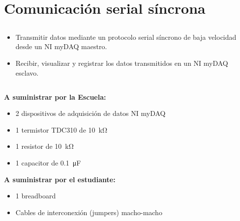 \chapter{Comunicación serial síncrona}
\section{\obj}
\capacidad
\begin{itemize}
\item Transmitir datos mediante un protocolo serial síncrono de baja velocidad desde un NI myDAQ maestro.
\item Recibir, visualizar y registrar los datos transmitidos en un NI myDAQ esclavo.
\end{itemize}

\section{\mat}
\textbf{A suministrar por la Escuela:}
\begin{itemize}
\item 2 dispositivos de adquisición de datos NI myDAQ
\item 1 termistor TDC310 de \SI{10}{\kilo\ohm}
\item 1 resistor de \SI{10}{\kilo\ohm}
\item 1 capacitor de \SI{0.1}{\micro\farad}
\end{itemize}

\textbf{A suministrar por el estudiante:}
\begin{itemize}
\item 1 breadboard
\item Cables de interconexión (jumpers) macho-macho
\end{itemize}

